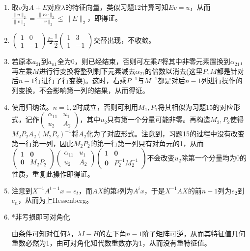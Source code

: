\documentclass[a4paper,UTF8,fontset=windows]{ctexart}
\begin{document}
\begin{enumerate}
\item
取$v$为$A+E$对应$\lambda$的特征向量，类似习题12计算可知$Ev=u$，从而$\frac{\|u\|_2}{\|v\|_2}=\frac{\|Ev\|_2}{\|v\|_2}\le\|E\|_2$，即得证。

\item
$\begin{pmatrix}1&0\\1&-1\end{pmatrix}$与$\dfrac{1}{2}\begin{pmatrix}1&3\\1&-1\end{pmatrix}$交替出现，不收敛。

\item
若原本$a_{21}$到$a_{n1}$全为0，则已经结束，否则可左乘$P$将其中非零元素置换到$\alpha_{21}$，再左乘$M$进行行变换将整列剩下元素减去$\alpha_{21}$的倍数以消去(这里$P,M$都是针对后$n-1$行进行了行变换)。这时，右乘$P^{-1}$与$M^{-1}$都是对后$n-1$列进行操作的列变换，不会影响第一列的结果，从而得证。

\item
使用归纳法。$n=1,2$时成立，否则可利用$M_1,P_1$将其相似为习题15的对应形式，记作$\begin{pmatrix}\alpha_{11}&u_1\\u_2&A_2\end{pmatrix}$，其中$u_2$只有第一个分量可能非零。再构造$M_2,P_2$使得$M_2P_2A_2(M_2P_2)^{-1}$将$A_2$化为了对应形式。注意到，习题15的过程中没有改变第一行第一列，因此$M_2P_2$的第一行第一列只有对角元的1，从而$\begin{pmatrix}1&\mathbf{0}\\\mathbf{0}&M_2P_2\end{pmatrix}\begin{pmatrix}\alpha_{11}&u_1\\u_2&A_2\end{pmatrix}\begin{pmatrix}1&\mathbf{0}\\\mathbf{0}&P_2^{-1}M_2^{-1}\end{pmatrix}$不会改变$u_2$除第一个分量均为0的性质，重复此操作即得证。

\item
注意到$X^{-1}A^{t-1}x=e_t$，而$AX$的第$i$列为$A^ix$，于是$X^{-1}AX$的前$n-1$列为$e_2$到$e_n$，从而为上Hessenberg。

\item
*非亏损即可对角化

由条件可知对任何$\lambda$，$\lambda I-H$的左下角$n-1$阶子矩阵可逆，从而其特征值几何重数必然为1，由可对角化知代数重数亦为1，从而没有重特征值。


\end{enumerate}
\end{document}
